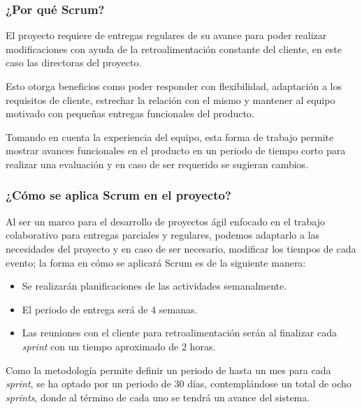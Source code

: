 \subsubsection*{¿Por qué Scrum?}
El proyecto requiere de entregas regulares de su avance para poder realizar modificaciones con ayuda de la retroalimentación constante del cliente, en este caso las directoras del proyecto.


Esto otorga beneficios como poder responder con flexibilidad, adaptación a los requisitos de cliente, estrechar la relación con el mismo y mantener al equipo motivado con pequeñas entregas funcionales del producto.


Tomando en cuenta la experiencia del equipo, esta forma de trabajo permite mostrar avances funcionales en el producto en un periodo de tiempo corto para realizar una evaluación y en caso de ser requerido se sugieran cambios.


\subsubsection*{¿Cómo se aplica Scrum en el proyecto?}

Al ser un marco para el desarrollo de proyectos ágil enfocado en el trabajo colaborativo para entregas parciales y regulares, podemos adaptarlo a las necesidades del proyecto y en caso de ser necesario, modificar los tiempos de cada  evento; la forma en cómo se aplicará Scrum es de la siguiente manera:
\begin{itemize}
	\item Se realizarán planificaciones de las actividades semanalmente.
	\item El periodo de entrega será de 4 semanas.
	\item Las reuniones con el cliente para retroalimentación serán al finalizar cada \textit{sprint} con un tiempo aproximado de 2 horas.
\end{itemize}


Como la metodología permite definir un periodo de hasta un mes para cada \textit{sprint}, se ha optado por un periodo de 30 días, contemplándose un total de ocho \textit{sprints}, donde al término de cada uno se tendrá un avance del sistema.